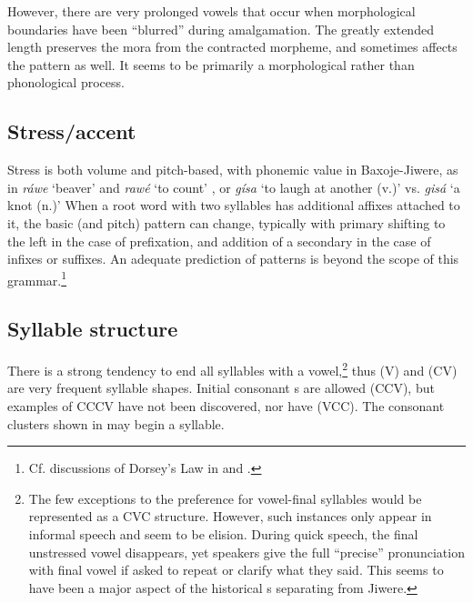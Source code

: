 \documentclass[output=paper]{LSP/langsci}
\begin{document}
However, there are very prolonged vowels that occur when morphological boundaries have been ``blurred'' during amalgamation.  The greatly extended length preserves the mora from the contracted morpheme, and sometimes affects the  pattern as well.  It seems to be primarily a morphological rather than phonological process.  

\subsection{Stress/accent} 
Stress is both volume and pitch-based, with phonemic value in Baxoje-Jiwere, as in \textit{ráwe} `beaver' and \textit{rawé} `to count' \citep{GoodtracksND}, or \textit{g\'isa} `to laugh at another (v.)' vs. \textit{gisá}  `a knot (n.)'  \citep{DorseyNDChiwere}   When a root word with two syllables has additional affixes attached to it, the basic  (and pitch) pattern can change, typically with primary  shifting to the left in the case of prefixation, and addition of a secondary  in the case of infixes or suffixes.  An adequate prediction of  patterns is beyond the scope of this grammar.\footnote{Cf. discussions of Dorsey's Law in \citet{Miner1979b} and \citet{HaleWhiteEagle1980}.} 

\subsection{Syllable structure} There is a strong tendency to end all syllables with a vowel,\footnote{The few exceptions to the preference for vowel-final syllables would be represented as a CVC structure. However, such instances only appear in informal speech and seem to be elision. During quick speech, the final unstressed vowel disappears, yet speakers give the full ``precise'' pronunciation with final vowel if asked to repeat or clarify what they said. This seems to have been a major aspect of the historical s separating  from Jiwere.} thus (V) and (CV) are very frequent syllable shapes. Initial consonant s are allowed (CCV), but examples of CCCV have not been discovered, nor have (VCC).  The consonant clusters shown in  may begin a syllable. 
\end{document}
